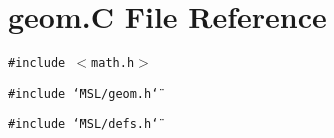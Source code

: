 \section{geom.C File Reference}
\label{geom_8C}
{\tt \#include $<$math.h$>$}\par
{\tt \#include \char`\"{}MSL/geom.h\char`\"{}}\par
{\tt \#include \char`\"{}MSL/defs.h\char`\"{}}\par
